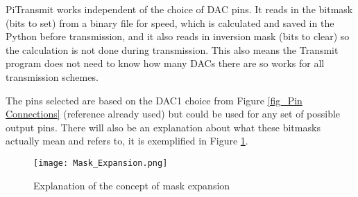 \documentclass[../main.tex]{subfiles}
\begin{document}
PiTransmit works independent of the choice of DAC pins.
It reads in the bitmask (bits to set) from a binary file for speed, which is calculated and saved in the Python before transmission, and it also reads in inversion mask (bits to clear) so the calculation is not done during transmission.
This also means the Transmit program does not need to know how many DACs there are so works for all transmission schemes.

The pins selected are based on the DAC1 choice from Figure \ref{fig_Pin Connections} (reference already used) but could be used for any set of possible output pins.
There will also be an explanation about what these bitmasks actually mean and refers to, it is exemplified in Figure \ref{fig_Mask Expansion}.

\begin{figure}[ht]
	\centering
	\texttt{[image: Mask\_Expansion.png]}
	\caption{Explanation of the concept of mask expansion}
	\label{fig_Mask Expansion}
\end{figure}
\end{document}
